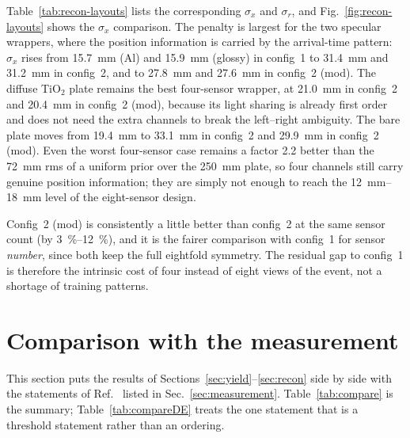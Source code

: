 \documentclass[11pt,a4paper]{article}
\begin{document}
Table~\ref{tab:recon-layouts} lists the corresponding $\sigma_x$ and
$\sigma_r$, and Fig.~\ref{fig:recon-layouts} shows the $\sigma_x$ comparison.
The penalty is largest for the two specular wrappers, where the position
information is carried by the arrival-time pattern: $\sigma_x$ rises from
\SI{15.7}{\milli\meter} (Al) and \SI{15.9}{\milli\meter} (glossy) in config~1
to \SI{31.4}{\milli\meter} and \SI{31.2}{\milli\meter} in config~2, and to
\SI{27.8}{\milli\meter} and \SI{27.6}{\milli\meter} in config~2 (mod).
The diffuse TiO$_2$ plate remains the best four-sensor wrapper, at
\SI{21.0}{\milli\meter} in config~2 and \SI{20.4}{\milli\meter} in config~2
(mod), because its light sharing is already first order and does not need the
extra channels to break the left--right ambiguity.  The bare plate moves from \SI{19.4}{\milli\meter} to
\SI{33.1}{\milli\meter} in config~2 and \SI{29.9}{\milli\meter} in config~2
(mod).  Even the worst four-sensor case remains a factor \num{2.2} better than
the \SI{72}{\milli\meter} rms of a uniform prior over the
\SI{250}{\milli\meter} plate, so four channels still carry genuine position
information; they are simply not enough to reach the
\SIrange{12}{18}{\milli\meter} level of the eight-sensor design.

Config~2 (mod) is consistently a little better than config~2 at the same
sensor count (by \SIrange{3}{12}{\percent}), and it is the fairer comparison
with config~1 for sensor \emph{number}, since both keep the full eightfold
symmetry.  The residual gap to config~1 is therefore the intrinsic cost of
four instead of eight views of the event, not a shortage of training patterns.

\section{Comparison with the measurement}
\label{sec:comparison}

This section puts the results of Sections~\ref{sec:yield}--\ref{sec:recon}
side by side with the statements of Ref.~\cite{Rao2025} listed in
Sec.~\ref{sec:measurement}. Table~\ref{tab:compare} is the summary;
Table~\ref{tab:compareDE} treats the one statement that is a threshold
statement rather than an ordering.
\end{document}
